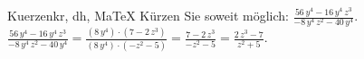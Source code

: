 \begin{MAufgabe}{Kuerzen}{kr, dh, MaTeX}
K\"urzen Sie soweit m\"oglich: $\frac{56\, y^4 - 16\, y^4\, z^3}{ - 8\, y^4\, z^2 - 40\, y^4}$.\\ 
\ifLsg\MLoesung
\quad $\frac{56\, y^4 - 16\, y^4\, z^3}{ - 8\, y^4\, z^2 - 40\, y^4}=\frac{(8\, y^4)\cdot(7 - 2\, z^3)}{(8\, y^4)\cdot( - z^2 - 5)}=\frac{7 - 2\, z^3}{ - z^2 - 5}=\frac{2\, z^3 - 7}{z^2 + 5}$.\else\relax\fi
 \end{MAufgabe}
